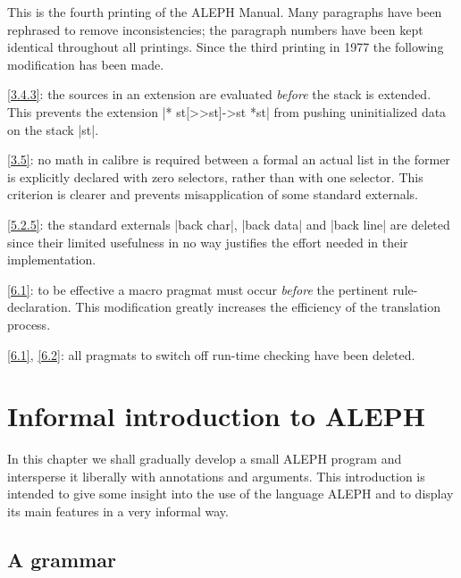 \documentclass{article}
\newcommand\A{{\sf ALEPH}}
\newcommand\g[1]{{\sf #1}}
\begin{document}
\medskip

This is the fourth printing of the \A{} Manual. Many paragraphs have been
rephrased to remove inconsistencies; the paragraph numbers have been kept
identical throughout all printings. Since the third printing in 1977 the
following modification has been made.

\ref{3.4.3}: the \g{source}s in an \g{extension} are evaluated
\textit{before} the stack is extended. This prevents the \g{extension}
\pp|* st[>>st]->st *st| from pushing uninitialized data on the stack \pp|st|.

\ref{3.5}: no math in calibre is required between a formal an actual list in
the former is explicitly declared with zero selectors, rather than with one
selector. This criterion is clearer and prevents misapplication of some
standard externals.

\ref{5.2.5}: the standard externals \pp|back char|, \pp|back data| and
\pp|back line| are deleted since their limited usefulness in no way
justifies the effort needed in their implementation.

\ref{6.1}: to be effective a \g{macro} pragmat must occur \emph{before} the
pertinent \g{rule-declaration}. This modification greatly increases the
efficiency of the translation process.

\ref{6.1}, \ref{6.2}: all pragmats to switch off run-time checking have been
deleted.

%
%

\section{Informal introduction to \A}\label{sec:1}

In this chapter we shall gradually develop a small \A{} program and
intersperse it liberally with annotations and arguments. This introduction
is intended to give some insight into the use of the language \A{} and to
display its main features in a very informal way.

\subsection{A grammar}\label{1.1}
\end{document}
